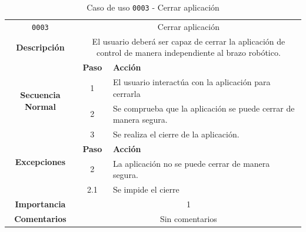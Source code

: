 \begin{table}[H]
    \centering
    \begin{tabularx}{\textwidth}{|c|c|X|}
        \cline{1-3}
        \texttt{0003}        & \multicolumn{2}{c|}{Cerrar aplicación}                                                       
        \\ \cline{1-3}
        \textbf{Descripción} & \multicolumn{2}{m{13cm}|}{El usuario deberá ser capaz de cerrar la aplicación de control de manera independiente al brazo robótico.}
        \\ \cline{1-3}
        \multirow{4}{*}{\textbf{Secuencia Normal}} & \textbf{Paso} & \textbf{Acción}
        \\ \cline{2-3}                    &   1  & El usuario interactúa con la aplicación para cerrarla
        \\ \cline{2-3}                    &   2  & Se comprueba que la  aplicación se puede cerrar de manera segura.
        \\ \cline{2-3}                    &   3  & Se realiza el cierre de la aplicación.
        \\ \cline{1-3}
        \multirow{2}{*}{\textbf{Excepciones}} & \textbf{Paso} & \textbf{Acción}
        \\ \cline{2-3}                        &  2  & La aplicación no se puede cerrar de manera segura.
        \\ \cline{2-3}                        & 2.1 & Se impide el cierre
        \\ \cline{1-3}
        \textbf{Importancia}                 & \multicolumn{2}{c|}{1}           
        \\ \cline{1-3}
        \textbf{Comentarios}                 & \multicolumn{2}{c|}{Sin comentarios}
        \\ \cline{1-3}
    \end{tabularx}
    \caption{Caso de uso \texttt{0003} - Cerrar aplicación}
\end{table}


